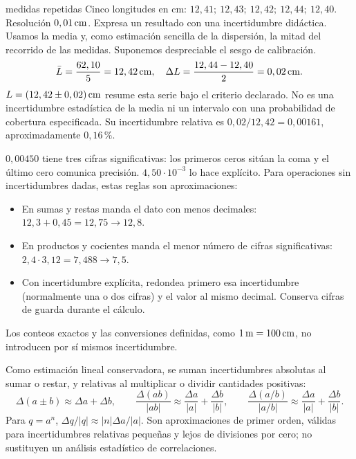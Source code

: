 \documentclass[11pt,a4paper]{article}
\begin{document}
\begin{examplebox}{medidas repetidas}
 Cinco longitudes en cm:
$12,41;\ 12,43;\ 12,42;\ 12,44;\ 12,40$. Resoluci\'on $0,01\,\mathrm{cm}$.
Expresa un resultado con una incertidumbre did\'actica.
\solutionblock
{} Usamos la media y, como estimaci\'on sencilla de la dispersi\'on,
la mitad del recorrido de las medidas. Suponemos despreciable el sesgo de calibraci\'on.
\[
\bar L=\frac{62,10}{5}=12,42\,\mathrm{cm},\quad
\Delta L=\frac{12,44-12,40}{2}=0,02\,\mathrm{cm}.
\]
 $L=(12,42\pm0,02)\,\mathrm{cm}$ resume esta serie bajo el criterio
declarado. No es una incertidumbre estad\'istica de la media ni un intervalo con una
probabilidad de cobertura especificada. Su incertidumbre relativa es
$0,02/12,42=0,00161$, aproximadamente $0,16\,\text{\%}$.
\end{examplebox}

$0,00450$ tiene tres cifras significativas: los primeros ceros sit\'uan la coma y
el \'ultimo cero comunica precisi\'on. $4,50\cdot10^{-3}$ lo hace expl\'icito.
Para operaciones sin incertidumbres dadas, estas reglas son aproximaciones:
\begin{itemize}
\item En sumas y restas manda el dato con menos decimales:
$12,3+0,45=12,75\to12,8$.
\item En productos y cocientes manda el menor n\'umero de cifras significativas:
$2,4\cdot3,12=7,488\to7,5$.
\item Con incertidumbre expl\'icita, redondea primero esa incertidumbre
(normalmente una o dos cifras) y el valor al mismo decimal.
Conserva cifras de guarda durante el c\'alculo.
\end{itemize}
Los conteos exactos y las conversiones definidas, como $1\,\mathrm{m}=100\,\mathrm{cm}$,
no introducen por s\'i mismos incertidumbre.

Como estimaci\'on lineal conservadora, se suman incertidumbres absolutas al sumar o
restar, y relativas al multiplicar o dividir cantidades positivas:
\[
\Delta(a\pm b)\approx\Delta a+\Delta b,\qquad
\frac{\Delta(ab)}{|ab|}\approx\frac{\Delta a}{|a|}+\frac{\Delta b}{|b|},\qquad
\frac{\Delta(a/b)}{|a/b|}\approx\frac{\Delta a}{|a|}+\frac{\Delta b}{|b|}.
\]
Para $q=a^n$, $\Delta q/|q|\approx |n|\Delta a/|a|$.
Son aproximaciones de primer orden, v\'alidas para incertidumbres relativas peque\~nas
y lejos de divisiones por cero; no sustituyen un an\'alisis estad\'istico de correlaciones.
\end{document}
